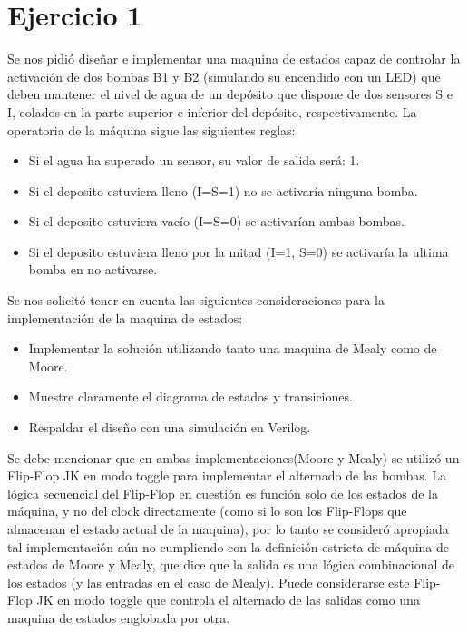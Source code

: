 \part*{Ejercicio 1}
Se nos pidió diseñar e implementar una maquina de estados capaz de controlar la activación de dos bombas B1 y B2 (simulando su encendido con un LED) que deben mantener el nivel de agua de un depósito que dispone de dos sensores S e I, colados en la parte superior e inferior del depósito, respectivamente. La operatoria de la máquina sigue las siguientes reglas:

\begin{itemize}
\item Si el agua ha superado un sensor, su valor de salida será: 1.
\item Si el deposito estuviera lleno (I=S=1) no se activaría ninguna bomba.
\item Si el deposito estuviera vacío (I=S=0) se activarían ambas bombas.
\item Si el deposito estuviera lleno por la mitad (I=1, S=0) se activaría la ultima bomba en no activarse. 
\end{itemize}

Se nos solicitó tener en cuenta las siguientes consideraciones para la implementación de la maquina de estados:

\begin{itemize}
\item Implementar la solución utilizando tanto una maquina de Mealy como de Moore.
\item Muestre claramente el diagrama de estados y transiciones.
\item Respaldar el diseño con una simulación en Verilog.
\end{itemize} 

Se debe mencionar que en ambas implementaciones(Moore y Mealy) se utilizó un Flip-Flop JK en modo toggle para implementar el alternado de las bombas. La lógica secuencial del Flip-Flop en cuestión es función solo de los estados de la máquina, y no del clock directamente (como si lo son los Flip-Flops que almacenan el estado actual de la maquina), por lo tanto se consideró apropiada tal implementación aún no cumpliendo con la definición estricta de máquina de estados de Moore y Mealy, que dice que la salida es una lógica combinacional de los estados (y las entradas en el caso de Mealy). Puede considerarse este Flip-Flop JK en modo toggle que controla el alternado de las salidas como una maquina de estados englobada por otra. 

